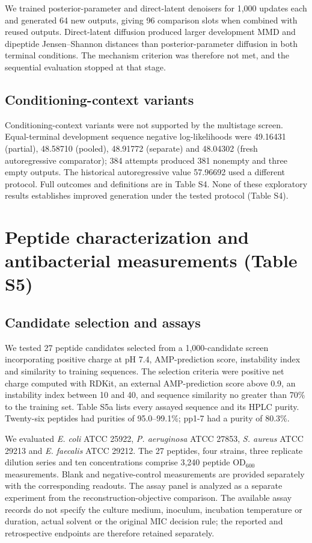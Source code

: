\documentclass[11pt,a4paper]{article}
\begin{document}
We trained posterior-parameter and direct-latent denoisers for 1,000 updates each and generated 64 new outputs, giving 96 comparison slots when combined with reused outputs. Direct-latent diffusion produced larger development MMD and dipeptide Jensen--Shannon distances than posterior-parameter diffusion in both terminal conditions. The mechanism criterion was therefore not met, and the sequential evaluation stopped at that stage. 

\subsection*{Conditioning-context variants}
Conditioning-context variants were not supported by the multistage screen. Equal-terminal development sequence negative log-likelihoods were 49.16431 (partial), 48.58710 (pooled), 48.91772 (separate) and 48.04302 (fresh autoregressive comparator); 384 attempts produced 381 nonempty and three empty outputs. The historical autoregressive value 57.96692 used a different protocol. Full outcomes and definitions are in Table S4. None of these exploratory results establishes improved generation under the tested protocol (Table S4).


\section{Peptide characterization and antibacterial measurements (Table S5)}
\subsection*{Candidate selection and assays}
We tested 27 peptide candidates selected from a 1,000-candidate screen incorporating positive charge at pH 7.4, AMP-prediction score, instability index and similarity to training sequences. The selection criteria were positive net charge computed with RDKit, an external AMP-prediction score above 0.9, an instability index between 10 and 40, and sequence similarity no greater than 70\% to the training set. Table S5a lists every assayed sequence and its HPLC purity. Twenty-six peptides had purities of 95.0--99.1\%; pp1-7 had a purity of 80.3\%.

We evaluated \textit{E. coli} ATCC 25922, \textit{P. aeruginosa} ATCC 27853, \textit{S. aureus} ATCC 29213 and \textit{E. faecalis} ATCC 29212. The 27 peptides, four strains, three replicate dilution series and ten concentrations comprise 3,240 peptide OD$_{600}$ measurements. Blank and negative-control measurements are provided separately with the corresponding readouts. The assay panel is analyzed as a separate experiment from the reconstruction-objective comparison. The available assay records do not specify the culture medium, inoculum, incubation temperature or duration, actual solvent or the original MIC decision rule; the reported and retrospective endpoints are therefore retained separately.
\end{document}
